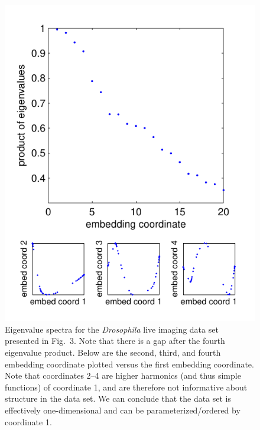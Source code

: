 \documentclass[10pt,twocolumn]{article}
\newcommand{\fig}[0]{Fig.}
\begin{document}
\begin{figure}
\includegraphics{figS3}
\caption{Eigenvalue spectra for the {\em Drosophila} live imaging data set presented in \fig~3. Note that there is a gap after the fourth eigenvalue product. Below are the second, third, and fourth embedding coordinate plotted versus the first embedding coordinate. Note that coordinates 2--4 are higher harmonics (and thus simple functions) of coordinate 1, and are therefore not informative about structure in the data set.  We can conclude that the data set is effectively one-dimensional and can be parameterized/ordered by coordinate 1.}
\end{figure}
\end{document}
